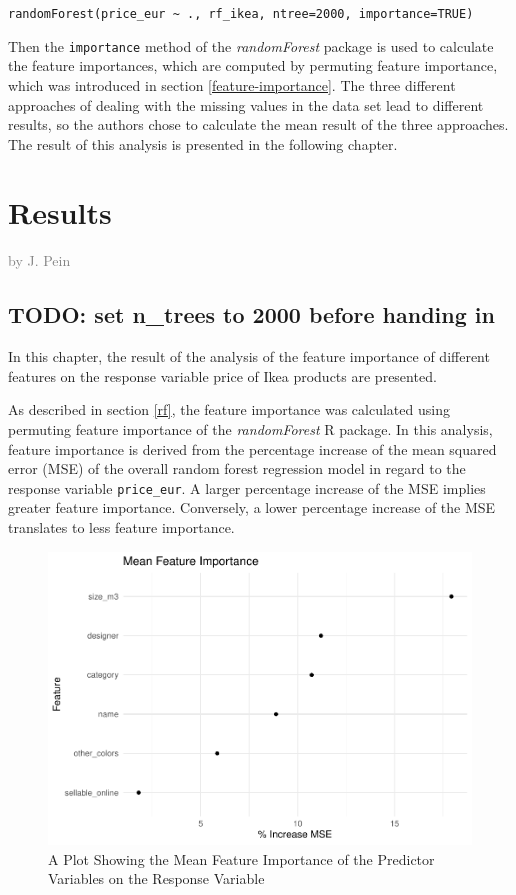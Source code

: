 \documentclass[a4paper, nobind]{templates/ociamthesis}
\begin{document}
\texttt{randomForest(price\_eur\ \textasciitilde{}\ .,\ rf\_ikea,\ ntree=2000,\ importance=TRUE)}

Then the \texttt{importance} method of the \emph{randomForest} package is used to calculate the feature importances, which are computed by permuting feature importance, which was introduced in section \ref{feature-importance}. The three different approaches of dealing with the missing values in the data set lead to different results, so the authors chose to calculate the mean result of the three approaches. The result of this analysis is presented in the following chapter.

\hypertarget{results}{%
\chapter{Results}\label{results}}

\hfill\textcolor{gray}{by J. Pein}

\hypertarget{todo-set-n_trees-to-2000-before-handing-in}{%
\section{TODO: set n\_trees to 2000 before handing in}\label{todo-set-n_trees-to-2000-before-handing-in}}

In this chapter, the result of the analysis of the feature importance of different features on the response variable price of Ikea products are presented.

As described in section \ref{rf}, the feature importance was calculated using permuting feature importance of the \emph{randomForest} R package. In this analysis, feature importance is derived from the percentage increase of the mean squared error (MSE) of the overall random forest regression model in regard to the response variable \texttt{price\_eur}. A larger percentage increase of the MSE implies greater feature importance. Conversely, a lower percentage increase of the MSE translates to less feature importance.

\begin{figure}
\includegraphics[width=1\linewidth]{_main_files/figure-latex/mean-feature-importance-1} \caption{A Plot Showing the Mean Feature Importance of the Predictor Variables on the Response Variable}\label{fig:mean-feature-importance}
\end{figure}
\end{document}
